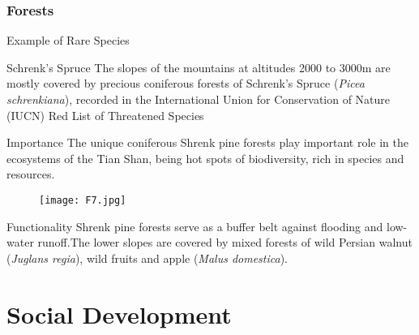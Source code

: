 \documentclass[pdflatex,compress,8pt,
	xcolor={dvipsnames,dvipsnames,svgnames,x11names,table},
	hyperref={colorlinks = true,
	breaklinks = true, 
	urlcolor = NavyBlue, 
	breaklinks = true}]{beamer}
\begin{document}
\begin{frame}\frametitle{Forests}
Example of Rare Species

\begin{alertblock}{Schrenk’s Spruce}
The slopes of the mountains at altitudes 2000 to 3000m are mostly covered by precious coniferous forests of Schrenk’s Spruce (\emph{Picea schrenkiana}), recorded in the International Union for Conservation of Nature (IUCN) Red List of Threatened Species
\end{alertblock}

\begin{block}{Importance}
The unique coniferous Shrenk pine forests play important role in the ecosystems of the Tian Shan, being hot spots of biodiversity, rich in species and resources.
\end{block}

\begin{figure}[H]
	\centering
		\texttt{[image: F7.jpg]}
\end{figure}

\begin{examples}{Functionality}
Shrenk pine forests serve as a buffer belt against flooding and low-water runoff.The lower slopes are covered by mixed forests of wild Persian walnut (\emph{Juglans regia}), wild fruits and apple (\emph{Malus domestica}).
\end{examples}

\end{frame}

\section{Social Development}
\end{document}
